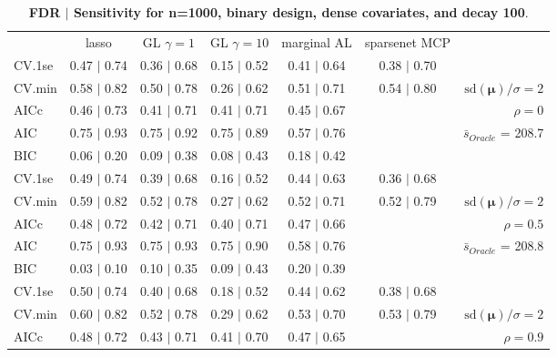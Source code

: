 \begin{table}\vspace{-.5cm}
\caption[l]{ {\it }
{ \bf FDR $\boldsymbol{\mid}$ Sensitivity for n=1000, binary design, dense covariates, and  decay  100}.}
\vspace{-.5cm}
\footnotesize{}
\begin{center}
\begin{tabular}{l*{5}{c}|r}
 & lasso & GL $\gamma=1$ & GL $\gamma=10$ & marginal AL & sparsenet MCP  & \\
 \cline{1-7}
CV.1se & 0.47 $\mid$ 0.74 & 0.36 $\mid$ 0.68 & 0.15 $\mid$ 0.52 & 0.41 $\mid$ 0.64 & 0.38 $\mid$ 0.70 & \\
CV.min & 0.58 $\mid$ 0.82 & 0.50 $\mid$ 0.78 & 0.26 $\mid$ 0.62 & 0.51 $\mid$ 0.71 & 0.54 $\mid$ 0.80 &  $\mathrm{sd}(\mathbf{\mu})/\sigma=2$ \\
AICc & 0.46 $\mid$ 0.73 & 0.41 $\mid$ 0.71 & 0.41 $\mid$ 0.71 & 0.45 $\mid$ 0.67 & & $\rho=0$ \\
AIC & 0.75 $\mid$ 0.93 & 0.75 $\mid$ 0.92 & 0.75 $\mid$ 0.89 & 0.57 $\mid$ 0.76 & &  \multirow{2}{*}{$\bar{s}_{Oracle}$ = 208.7} \\
BIC & 0.06 $\mid$ 0.20 & 0.09 $\mid$ 0.38 & 0.08 $\mid$ 0.43 & 0.18 $\mid$ 0.42 & &  \\
 \hline 
CV.1se & 0.49 $\mid$ 0.74 & 0.39 $\mid$ 0.68 & 0.16 $\mid$ 0.52 & 0.44 $\mid$ 0.63 & 0.36 $\mid$ 0.68 & \\
CV.min & 0.59 $\mid$ 0.82 & 0.52 $\mid$ 0.78 & 0.27 $\mid$ 0.62 & 0.52 $\mid$ 0.71 & 0.52 $\mid$ 0.79 &  $\mathrm{sd}(\mathbf{\mu})/\sigma=2$ \\
AICc & 0.48 $\mid$ 0.72 & 0.42 $\mid$ 0.71 & 0.40 $\mid$ 0.71 & 0.47 $\mid$ 0.66 & & $\rho=0.5$ \\
AIC & 0.75 $\mid$ 0.93 & 0.75 $\mid$ 0.93 & 0.75 $\mid$ 0.90 & 0.58 $\mid$ 0.76 & &  \multirow{2}{*}{$\bar{s}_{Oracle}$ = 208.8} \\
BIC & 0.03 $\mid$ 0.10 & 0.10 $\mid$ 0.35 & 0.09 $\mid$ 0.43 & 0.20 $\mid$ 0.39 & &  \\
 \hline 
CV.1se & 0.50 $\mid$ 0.74 & 0.40 $\mid$ 0.68 & 0.18 $\mid$ 0.52 & 0.44 $\mid$ 0.62 & 0.38 $\mid$ 0.68 & \\
CV.min & 0.60 $\mid$ 0.82 & 0.52 $\mid$ 0.78 & 0.29 $\mid$ 0.62 & 0.53 $\mid$ 0.70 & 0.53 $\mid$ 0.79 &  $\mathrm{sd}(\mathbf{\mu})/\sigma=2$ \\
AICc & 0.48 $\mid$ 0.72 & 0.43 $\mid$ 0.71 & 0.41 $\mid$ 0.70 & 0.47 $\mid$ 0.65 & & $\rho=0.9$ \\

\end{tabular}
\end{center}
\end{table}
